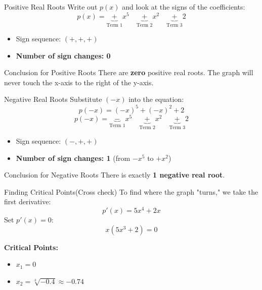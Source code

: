 \documentclass{beamer}
\begin{document}
\begin{frame}{ Positive Real Roots}
    Write out $p(x)$ and look at the signs of the coefficients:
    $$p(x) = \underbrace{+}_{\text{Term 1}} x^5 \quad \underbrace{+}_{\text{Term 2}} x^2 \quad \underbrace{+}_{\text{Term 3}} 2$$
    
    \begin{itemize}
        \item Sign sequence: $(+, +, +)$
        \item \textbf{Number of sign changes: 0}
    \end{itemize}
    
    \begin{alertblock}{Conclusion for Positive Roots}
        There are \textbf{zero} positive real roots. The graph will never touch the x-axis to the right of the y-axis.
    \end{alertblock}
\end{frame}

\begin{frame}{Negative Real Roots}
    Substitute $(-x)$ into the equation:
    $$p(-x) = (-x)^5 + (-x)^2 + 2$$
    $$p(-x) = \underbrace{-}_{\text{Term 1}} x^5 \quad \underbrace{+}_{\text{Term 2}} x^2 \quad \underbrace{+}_{\text{Term 3}} 2$$
    
    \begin{itemize}
        \item Sign sequence: $(-, +, +)$
        \item \textbf{Number of sign changes: 1} (from $-x^5$ to $+x^2$)
    \end{itemize}
    
    \begin{alertblock}{Conclusion for Negative Roots}
        There is exactly \textbf{1 negative real root}.
    \end{alertblock}
\end{frame}


\begin{frame}{ Finding Critical Points(Cross check)}
    To find where the graph "turns," we take the first derivative:
    $$p'(x) = 5x^4 + 2x$$
    Set $p'(x) = 0$:
    $$x(5x^3 + 2) = 0$$
    
    \textbf{Critical Points:}
    \begin{itemize}
        \item $x_1 = 0$
        \item $x_2 = \sqrt[3]{-0.4} \approx -0.74$
    \end{itemize}
\end{frame}
\end{document}
